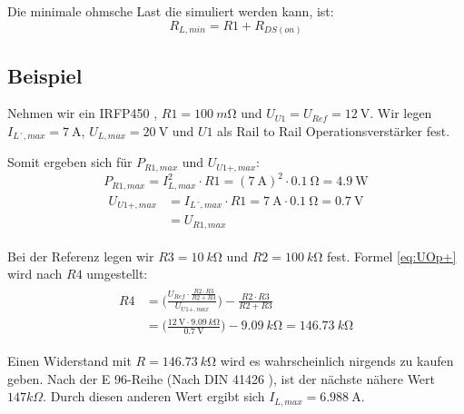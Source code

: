 Die minimale ohmsche Last die simuliert werden kann, ist:
\begin{equation}
	R_{L,min} = R1 + R_{DS(on)}
	\label{eq:R_Lmin}
\end{equation}


\subsection{Beispiel} 
\label{sec:Bsp}
Nehmen wir ein IRFP450 \cite{IRFP450}, $R1 = \SI{100}{m\ohm}$ und $U_{U1} = U_{Ref}= \SI{12}{\volt}$.
Wir legen $I_{L´,max} = \SI{7}{\ampere}$, $U_{L,max} = \SI{20}{\volt}$ und $U1$ als Rail to Rail Operationsverstärker fest.

Somit ergeben sich für $P_{R1,max}$ und $U_{U1+,max}$: 
\begin{equation}
	P_{R1,max} = I_{L,max}^2  \cdot R1 = (\SI{7}{\ampere})^2 \cdot \SI{0,1}{\ohm} = \SI{4,9}{\watt}
\end{equation}
\begin{multline}
	\begin{split}
		U_{U1+,max} &= I_{L´,max} \cdot R1 = \SI{7}{\ampere} \cdot \SI{0,1}{\ohm} = \SI{0,7}{\volt} \\
		&= U_{R1,max}
	\end{split} 
\end{multline}


Bei der Referenz legen wir $R3 = \SI{10}{k\ohm}$ und $R2 = \SI{100}{k\ohm}$ fest. Formel \ref{eq:UOp+} 
wird nach $R4$ umgestellt:
\begin{multline}
	\begin{split}
		R4 &= \biggl( \frac{U_{Ref} \cdot \frac{R2 \cdot R3}{R2 + R3}}{U_{U1+,max}}\biggr) - \frac{R2 \cdot R3}{R2 + R3}\\
		&= \biggl( \frac{\SI{12}{\volt} \cdot \SI{9,09}{k\ohm}}{\SI{0,7}{\volt}}\biggr) - \SI{9,09}{k\ohm} = \SI{146,73}{k\ohm}
	\end{split}
\end{multline}

Einen Widerstand mit $R = \SI{146,73}{k\ohm}$ wird es wahrscheinlich nirgends zu kaufen geben. 
Nach der E 96-Reihe (Nach DIN 41426 \cite{E-Reihen}), ist der nächste nähere Wert $147 k\Omega$. 
Durch diesen anderen Wert ergibt sich $I_{L,max} = \SI{6,988}{\ampere}$.


